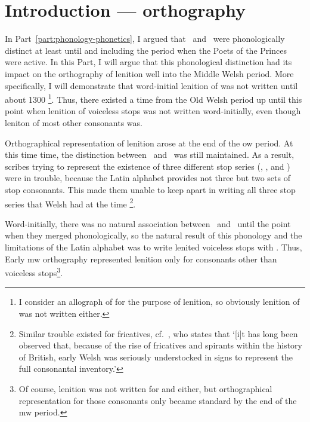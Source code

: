\chapter{Introduction --- orthography}
\label{cha:intr-orth}

In Part~\ref{part:phonology-phonetics}, I argued that \lT\ and \xD\ were phonologically distinct at least until and including the period when the Poets of the Princes were active. In this Part, I will argue that this phonological distinction had its impact on the orthography of lenition well into the Middle Welsh period. More specifically, I will demonstrate that word-initial lenition of  was not written until about 1300%
\footnote{I consider  an allograph of  for the purpose of lenition, so obviously lenition of  was not written either.}.
Thus, there existed a time from the Old Welsh period up until this point when lenition of  voiceless stops was not written word-initially, even though leniton of most other consonants was.

Orthographical representation of lenition arose at the end of the \gls{ow} period. At this time time, the distinction between \lT\ and \xD\ was still maintained. As a result, scribes trying to represent the existence of three different stop series (\xT, \lT, and \xD) were in trouble, because the Latin alphabet  provides not three but two sets of stop consonants. This made them unable to keep apart in writing all three stop series that Welsh had at the time%
\footnote{Similar trouble existed for fricatives, cf.\ \textcite[28]{russell_rowynniauc_2003}, who states that `[i]t has long been observed that, because of the rise of fricatives and spirants within the history of British, early Welsh was seriously understocked in signs to represent the full consonantal inventory.'}.

Word-initially, there was no natural association between \lT\ and \xD\ until the point when they merged phonologically, so the natural result of this phonology and the limitations of the Latin alphabet was to write lenited voiceless stops with . Thus, Early \gls{mw} orthography represented lenition only for consonants other than voiceless stops\footnote{Of course, lenition was not written for  and  either, but orthographical representation for those consonants only became standard by the end of the \gls{mw} period.}.

